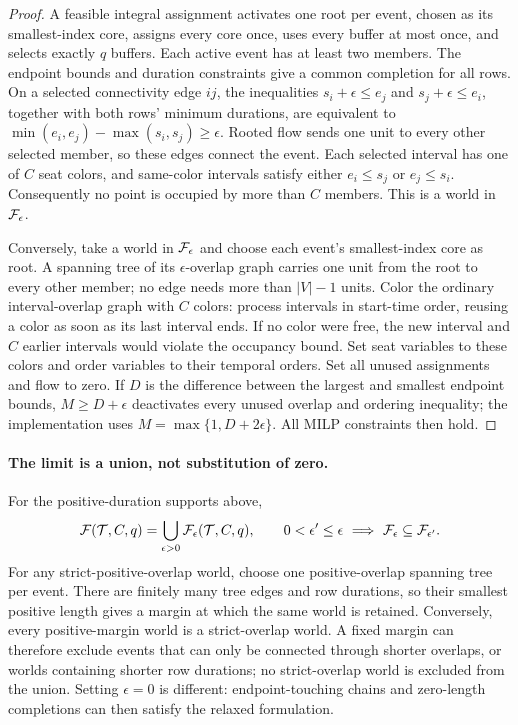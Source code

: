\begin{proof}
A feasible integral assignment activates one root per event, chosen as its
smallest-index core, assigns every core once, uses every buffer at most once,
and selects exactly $q$ buffers. Each active event has at least two members.
The endpoint bounds and duration constraints give a common completion for
all rows. On a selected connectivity edge $ij$, the inequalities
$s_i+\epsilon\le e_j$ and $s_j+\epsilon\le e_i$, together with both rows'
minimum durations, are equivalent to
$\min(e_i,e_j)-\max(s_i,s_j)\ge\epsilon$.
Rooted flow sends one unit to every other selected member, so these edges
connect the event. Each selected interval has one of $C$ seat colors, and
same-color intervals satisfy either $e_i\le s_j$ or $e_j\le s_i$.
Consequently no point is occupied by more than $C$ members. This is a world
in $\mathcal F_\epsilon$.

Conversely, take a world in $\mathcal F_\epsilon$ and choose each event's
smallest-index core as root. A spanning tree of its $\epsilon$-overlap graph
carries one unit from the root to every other member; no edge needs more
than $|V|-1$ units. Color the ordinary interval-overlap graph with $C$
colors: process intervals in start-time order, reusing a color as soon as
its last interval ends. If no color were free, the new interval and $C$
earlier intervals would violate the occupancy bound. Set seat variables to
these colors and order variables to their temporal orders. Set all unused
assignments and flow to zero. If $D$ is the difference between the largest
and smallest endpoint bounds, $M\ge D+\epsilon$ deactivates every unused
overlap and ordering inequality; the implementation uses
$M=\max\{1,D+2\epsilon\}$. All MILP constraints then hold.
\end{proof}

\paragraph{The limit is a union, not substitution of zero.}
For the positive-duration supports above,
\begin{equation}
 \mathcal F(\mathcal T,C,q)=\bigcup_{\epsilon>0}\mathcal F_\epsilon(\mathcal T,C,q),\qquad
 0<\epsilon'\le\epsilon
 \ \Longrightarrow\ \mathcal F_\epsilon\subseteq\mathcal F_{\epsilon'}.
 \label{eq:epsilon-union}
\end{equation}
For any strict-positive-overlap world, choose one positive-overlap spanning
tree per event. There are finitely many tree edges and row durations, so
their smallest positive length gives a margin at which the same world is
retained. Conversely, every positive-margin world is a strict-overlap world.
A fixed margin can therefore exclude events that can only be connected
through shorter overlaps, or worlds containing shorter row durations;
no strict-overlap world is excluded from the union. Setting $\epsilon=0$
is different: endpoint-touching chains and zero-length completions can then
satisfy the relaxed formulation.

